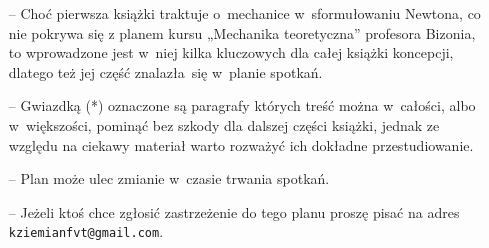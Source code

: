\documentclass[a4paper,11pt]{article}
\begin{document}
\begin{itemize}
\item[--] Choć pierwsza książki traktuje o~mechanice w~sformułowaniu
  Newtona, co nie pokrywa się z planem kursu „Mechanika teoretyczna”
  profesora Bizonia, to wprowadzone jest w~niej kilka kluczowych dla
  całej książki koncepcji, dlatego też jej część znalazła~się w~planie
  spotkań.

\item[--] Gwiazdką (*) oznaczone są paragrafy których treść można
  w~całości, albo w~większości, pominąć bez szkody dla dalszej części
  książki, jednak ze względu na ciekawy materiał warto rozważyć ich
  dokładne przestudiowanie.

\item[--] Plan może ulec zmianie w~czasie trwania spotkań.

\item[--] Jeżeli ktoś chce zgłosić zastrzeżenie do tego planu proszę
  pisać na adres \texttt{kziemianfvt@gmail.com}.

\end{itemize}
\end{document}
